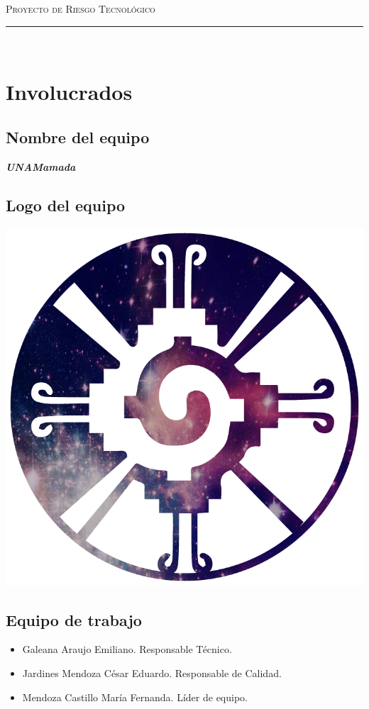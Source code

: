 \documentclass{article}
\begin{document}
\marginsize{2cm}{2cm}{1cm}{2cm} 

\begin{center}
  {\LARGE \scshape Proyecto de Riesgo Tecnológico\\\vspace{10mm} }
  \rule{0.8\textwidth}{.8pt}\\
\end{center}

\section*{Involucrados}
\subsection*{Nombre del equipo} \textit{\textbf{UNAMamada}}
\subsection*{Logo del equipo}
\begin{center}
  \includegraphics[scale=.2]{../imagenes/logo.jpg}
\end{center}

\subsection*{Equipo de trabajo}
\begin{itemize}
\item Galeana Araujo Emiliano. Responsable Técnico.
\item Jardines Mendoza César Eduardo. Responsable de Calidad.
\item Mendoza Castillo María Fernanda. Líder de equipo.
\end{itemize}
\end{document}
